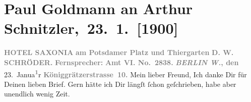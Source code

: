 

         
         \renewcommand{\erwaehntePersonen}{Personen: Richard Beer-Hofmann, Auguste Glümer, Marie Glümer, Paul Goldmann, Eva Marie Goldmann, D. W. Schröder}
         \renewcommand{\erwaehnteOrte}{Orte: Berlin, Florenz, Hotel Saxonia, Passauerstraße, Potsdamer Platz, Stresemannstraße, Tiergarten, Wien}
         \renewcommand{\erwaehnteWerke}{}
               \section[ Paul Goldmann an Arthur Schnitzler, 23. 1. {[}1900{]}]{ Paul Goldmann an Arthur Schnitzler, 23. 1. {[}1900{]}}\nopagebreak{}\rehead{ }\begin{ledgroupsized}[t]{13cm}\normalsize\beginnumbering \toendnotes[C]{\smallbreak\pagebreak[2]} 
\toendnotes[C]{\smallbreak}\pstart
           \noindent{}\centering{}{\pb}\textcolor{gray}{\textbf{\textbf{HOTEL SAXONIA}}}\pend
           \pstart
           \noindent{}\raggedleft{}\textcolor{gray}{\textbf{am Potsdamer Platz und
                        Thiergarten}}\pend
           \pstart
           \noindent{}\centering{}\textcolor{gray}{\textbf{D. W. SCHRÖDER.}}\pend
           \pstart
           \noindent{}\textcolor{gray}{\textbf{Fernsprecher:}}\pend
           \pstart
           \textcolor{gray}{\textbf{\textbf{Amt VI. No. 2838.}}}\pend
           \pstart
           \raggedleft{}\textcolor{gray}{\textbf{\emph{BERLIN W.}, den}}{ }23. Janua\substVorne{}\textsuperscript{\textcolor{gray}{\textbf{1}}}\substDazwischen{}r\substHinten{}\pend
           \pstart
           \raggedleft{}\textcolor{gray}{\textbf{Königgrätzerstrasse 10.}}\pend
           \pstart{}Mein lieber Freund,\pend\pstart
           Ich danke Dir für Deinen lieben Brief. Gern hätte ich Dir längſt ſchon geſchrieben,
               habe aber unendlich wenig Zeit.\pend

\end{ledgroupsized}
